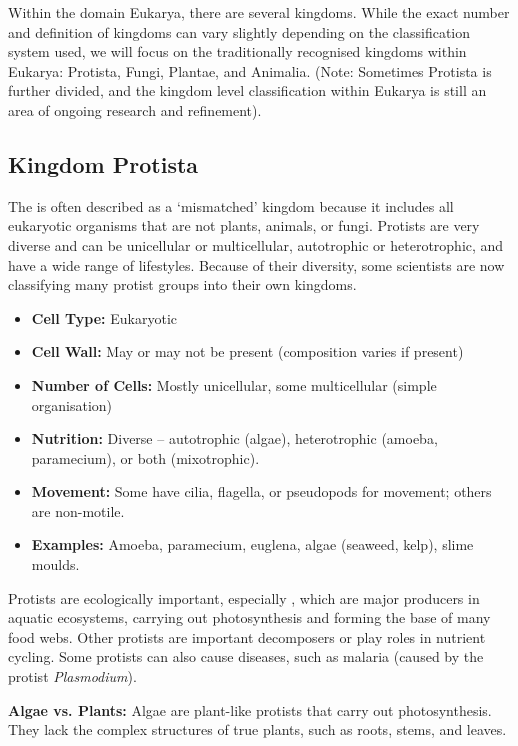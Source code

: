 \FloatBarrier

Within the domain Eukarya, there are several kingdoms.  While the exact number and definition of kingdoms can vary slightly depending on the classification system used, we will focus on the traditionally recognised kingdoms within Eukarya: Protista, Fungi, Plantae, and Animalia.  (Note: Sometimes Protista is further divided, and the kingdom level classification within Eukarya is still an area of ongoing research and refinement).

\subsection{Kingdom Protista}

The  is often described as a ‘mismatched’ kingdom because it includes all eukaryotic organisms that are not plants, animals, or fungi. Protists are very diverse and can be unicellular or multicellular, autotrophic or heterotrophic, and have a wide range of lifestyles.  Because of their diversity, some scientists are now classifying many protist groups into their own kingdoms.

\begin{itemize}
    \item \textbf{Cell Type:} Eukaryotic
    \item \textbf{Cell Wall:} May or may not be present (composition varies if present)
    \item \textbf{Number of Cells:} Mostly unicellular, some multicellular (simple organisation)
    \item \textbf{Nutrition:}  Diverse – autotrophic (algae), heterotrophic (amoeba, paramecium), or both (mixotrophic).
    \item \textbf{Movement:}  Some have cilia, flagella, or pseudopods for movement; others are non-motile.
    \item \textbf{Examples:} Amoeba, paramecium, euglena, algae (seaweed, kelp), slime moulds.
\end{itemize}

Protists are ecologically important, especially , which are major producers in aquatic ecosystems, carrying out photosynthesis and forming the base of many food webs.  Other protists are important decomposers or play roles in nutrient cycling. Some protists can also cause diseases, such as malaria (caused by the protist \textit{Plasmodium}).

\begin{marginnote}
\textbf{Algae vs. Plants:} Algae are plant-like protists that carry out photosynthesis.  They lack the complex structures of true plants, such as roots, stems, and leaves.
\end{marginnote}

